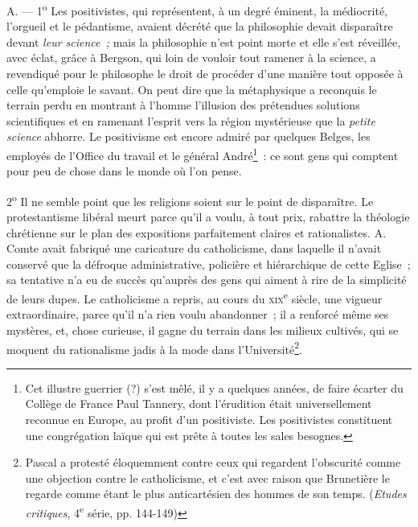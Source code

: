 \documentclass[french,twoside]{book} %
\begin{document}
\noindent A. — 1\textsuperscript{o} Les positivistes, qui représentent, à un degré éminent, la médiocrité, l’orgueil et le pédantisme,  avaient décrété que la philosophie devait disparaître devant \emph{leur science ;} mais la philosophie n’est point morte et elle s’est réveillée, avec éclat, grâce à Bergson, qui loin de vouloir tout ramener à la science, a revendiqué pour le philosophe le droit de procéder d’une manière tout opposée à celle qu’emploie le savant. On peut dire que la métaphysique a reconquis le terrain perdu en montrant à l’homme l’illusion des prétendues solutions scientifiques et en ramenant l’esprit vers la région mystérieuse que la \emph{petite science} abhorre. Le positivisme est encore admiré par quelques Belges, les employés de l’Office du travail et le général André\footnote{ \noindent Cet illustre guerrier (?) s’est mêlé, il y a quelques années, de faire écarter du Collège de France Paul Tannery, dont l’érudition était universellement reconnue en Europe, au profit d’un positiviste. Les positivistes constituent une congrégation laïque qui est prête à toutes les sales besognes.
 } : ce sont gens qui comptent pour peu de chose dans le monde où l’on pense.\par
2\textsuperscript{o} Il ne semble point que les religions soient sur le point de disparaître. Le protestantisme libéral meurt parce qu’il a voulu, à tout prix, rabattre la théologie chrétienne sur le plan des expositions parfaitement claires et rationalistes. A. Comte avait fabriqué une caricature du catholicisme, dans laquelle il n’avait conservé que la défroque administrative, policière et hiérarchique de cette Eglise ; sa tentative n’a eu de succès qu’auprès des gens qui aiment à rire de la simplicité de leurs dupes. Le catholicisme a repris, au cours du {\scshape xix}\textsuperscript{e} siècle, une vigueur extraordinaire, parce qu’il n’a rien voulu abandonner ; il a renforcé même ses mystères, et, chose  curieuse, il gagne du terrain dans les milieux cultivés, qui se moquent du rationalisme jadis à la mode dans l’Université\footnote{ \noindent Pascal a protesté éloquemment contre ceux qui regardent l’obscurité comme une objection contre le catholicisme, et c’est avec raison que Brunetière le regarde comme étant le plus anticartésien des hommes de son temps. (\emph{Etudes critiques}, 4\textsuperscript{e} série, pp. 144-149)
 }.\par
\end{document}
